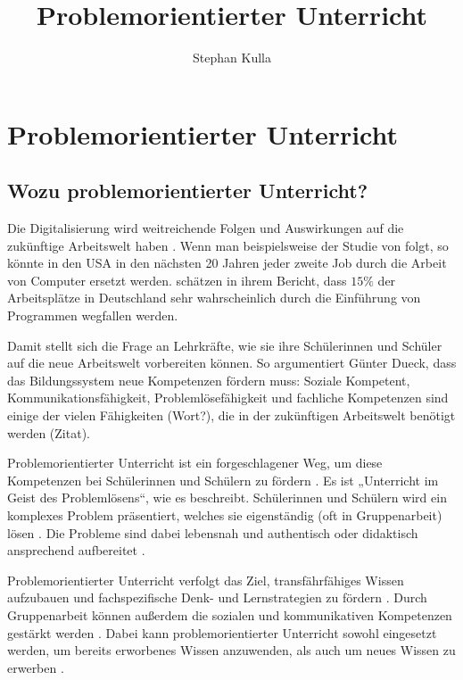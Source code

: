 \documentclass[jour,12pt,a4paper]{apa6}
\title{Problemorientierter Unterricht}
\author{Stephan Kulla}
\affiliation{TU München}
\begin{document}
\maketitle

\section{Problemorientierter Unterricht}

\subsection{Wozu problemorientierter Unterricht?}

Die Digitalisierung wird weitreichende Folgen und Auswirkungen auf die zukünftige Arbeitswelt haben \parencite{dengler2015}. Wenn man beispielsweise der Studie von \textcite{frey2017} folgt, so könnte in den USA in den nächsten 20 Jahren jeder zweite Job durch die Arbeit von Computer ersetzt werden. \textcite{dengler2015} schätzen in ihrem Bericht, dass $15\%$ der Arbeitsplätze in Deutschland sehr wahrscheinlich durch die Einführung von Programmen wegfallen werden.

Damit stellt sich die Frage an Lehrkräfte, wie sie ihre Schülerinnen und Schüler auf die neue Arbeitswelt vorbereiten können. So argumentiert Günter Dueck, dass das Bildungssystem neue Kompetenzen fördern muss: Soziale Kompetent, Kommunikationsfähigkeit, Problemlösefähigkeit und fachliche Kompetenzen sind einige der vielen Fähigkeiten (Wort?), die in der zukünftigen Arbeitswelt benötigt werden (Zitat).

Problemorientierter Unterricht ist ein forgeschlagener Weg, um diese Kompetenzen bei Schülerinnen und Schülern zu fördern \parencite{silver2004}. Es ist „Unterricht im Geist des Problemlösens“, wie \textcite{reusser2005} es beschreibt. Schülerinnen und Schülern wird ein komplexes Problem präsentiert, welches sie eigenständig (oft in Gruppenarbeit) lösen \parencite{silver2004}. Die Probleme sind dabei lebensnah und authentisch \parencite{kunter2013} oder didaktisch ansprechend aufbereitet \parencite{reusser2005}.

Problemorientierter Unterricht verfolgt das Ziel, transfährfähiges Wissen aufzubauen und fachspezifische Denk- und Lernstrategien zu fördern \parencite{reusser2005}. Durch Gruppenarbeit können außerdem die sozialen und kommunikativen Kompetenzen gestärkt werden \parencite{seidel2014}. Dabei kann problemorientierter Unterricht sowohl eingesetzt werden, um bereits erworbenes Wissen anzuwenden, als auch um neues Wissen zu erwerben \parencite{reusser2005}.
\end{document}
